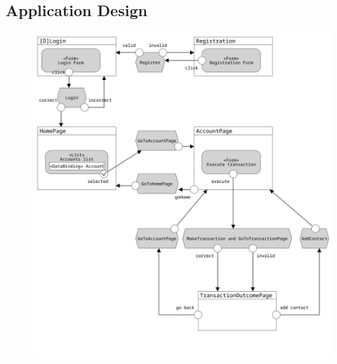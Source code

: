 \documentclass{article}
\begin{document}
\subsection{Application Design}
\begin{figure}[H]
	\centering
	\includegraphics[width=1\textwidth]{assets/ifml_pure.png}
\end{figure}
\end{document}
